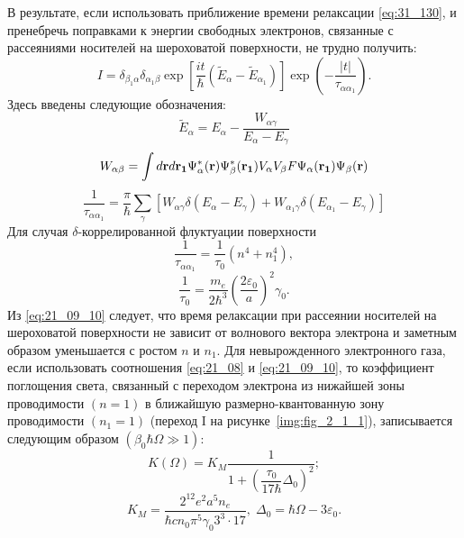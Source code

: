 В результате, если использовать приближение времени релаксации \eqref{eq:31_130}, и пренебречь поправками к энергии свободных электронов, связанные с рассеяниями носителей на шероховатой поверхности, не трудно получить:
\begin{equation} \label{eq:21_09_08}
I = \delta_{\beta_1\alpha} \delta_{\alpha_1\beta} \exp{\left[\frac{it}{\hbar} \left(\widetilde{E}_{\alpha} - \widetilde{E}_{\alpha_1} \right)  \right] } \exp{\left(- \frac{|t|}{\tau_{\alpha\alpha_1}} \right)}.
\end{equation}
Здесь введены следующие обозначения:
\[
\widetilde{E}_{\alpha} = E_{\alpha} - \frac{W_{\alpha \gamma}}{E_{\alpha} - E_{\gamma}}
\]
\[
W_{\alpha\beta}=\int{d\boldsymbol{\mathbf{r}} d\boldsymbol{\mathbf{r_1}} \Psi^*_\alpha(\boldsymbol{\mathbf{r}}) \Psi^*_\beta(\boldsymbol{\mathbf{r_1}}) V_\alpha V_\beta F \Psi_\alpha(\boldsymbol{\mathbf{r_1}}) \Psi_\beta(\boldsymbol{\mathbf{r}})}
\]
\[
\frac{1}{\tau_{\alpha\alpha_1}} = \frac{\pi}{\hbar} \sum_{\gamma } { \left[W_{\alpha \gamma }\delta \left(E_{\alpha} - E_{\gamma}\right) + W_{\alpha_1 \gamma }\delta \left(E_{\alpha_1} - E_{\gamma}\right) \right] }
\]
Для случая $\delta$-коррелированной флуктуации поверхности
\begin{equation} \label{eq:21_09_10}
\frac{1}{\tau_{\alpha\alpha_1}} = \frac{1}{\tau_0} \left(n^4 + n_1^4 \right) ,
\end{equation}
\[
\frac{1}{\tau_0}  = \frac{m_e}{2\hbar^3} \left(\frac{2\varepsilon_0}{a} \right)^2 \gamma_0. 
\]
Из \eqref{eq:21_09_10} следует, что время релаксации при рассеянии носителей на шероховатой поверхности не зависит от волнового вектора электрона и заметным образом уменьшается с ростом $n$ и $n_1$. Для невырожденного электронного газа, если использовать соотношения \eqref{eq:21_08} и \eqref{eq:21_09_10}, то коэффициент поглощения света, связанный с переходом электрона из нижайшей зоны проводимости $(n=1)$ в ближайшую размерно-квантованную зону проводимости $(n_1=1)$ (переход I на рисунке~\ref{img:fig_2_1_1}), записывается следующим образом $(\beta _0\hbar \Omega \gg 1)$:
\begin{equation} \label{eq:21_10}
K(\Omega) = K_M \frac{1}{1+\left(\dfrac{\tau_0 }{17 \hbar} \Delta_0 \right)^2 } ;
\end{equation} 
\[
K_M =\frac{2^{12} e^2 a^5 n_e }{\hbar cn_0 \pi^5 \gamma_0 3^3 \cdot 17}, \;
\Delta_0 =\hbar \Omega -3\varepsilon_0.
\]
